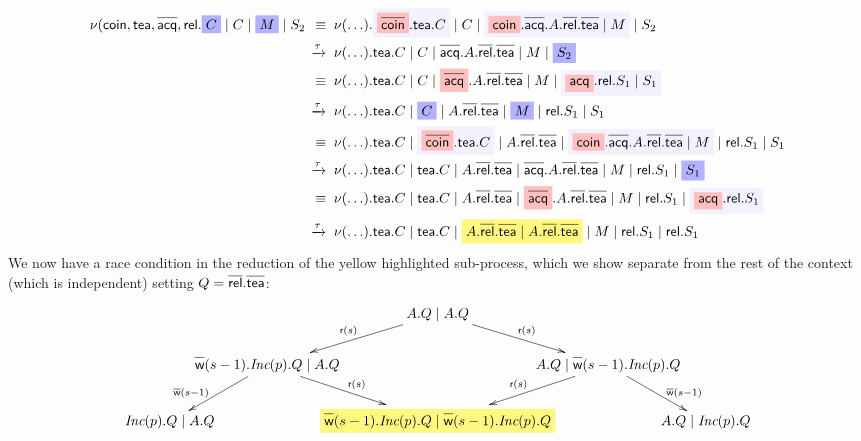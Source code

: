 \documentclass{article}
\def\mystrut{\rule{0pt}{0.68em}}
\newcommand{\act}[1]{\textsf{#1}}
\newcommand{\da}[1]{\overline{\mystrut\textsf{#1}}}
\newcommand{\dak}[1]{\overline{\textsf{#1}}}
\newcommand{\highlight}[1]{%
  \colorbox{yellow!50}{$\displaystyle#1$}}
\newcommand{\highlightG}[1]{%
  \colorbox{blue!30}{$\displaystyle#1$}}
\newcommand{\highlightR}[1]{%
  \colorbox{red!25}{$\displaystyle#1$}}
\newcommand{\highlightGH}[1]{%
  \colorbox{blue!5}{$\displaystyle#1$}}
\theoremstyle{definition}
\newcommand{\src}[1]{\highlightR{#1}}
\newcommand{\srch}[1]{\highlightG{#1}}
\newcommand{\trgh}[1]{\highlightGH{#1}}
\newcommand{\subd}[1]{\highlight{#1}}
\newcommand{\restr}[2]{\nu #2 . #1}
\begin{document}
\begin{align*}
  \restr{\srch{C} \mid C \mid \srch{M} \mid S_2}{(\act{coin}, \act{tea}, \da{acq}, \act{rel}} \;\,
\equiv \;\; & \restr{\trgh{\src{\da{coin}}.\act{tea}.C} \mid C \mid \trgh{\src{\act{coin}}.\da{acq}.A.\da{rel}.\da{tea} \mid M} \mid S_2}{(\ldots)} \\
\xrightarrow{\tau} \;\; & \restr{{\act{tea}.C} \mid C \mid {{\da{acq}}.A.\da{rel}.\da{tea} \mid M} \mid \srch{S_2}}{(\ldots)} \\
\equiv \;\; & \restr{{\act{tea}.C} \mid C \mid {{\src{\da{acq}}}.A.\da{rel}.\da{tea} \mid M} \mid \trgh{\src{\act{acq}}.\act{rel}.S_1 \mid S_1}}{(\ldots)} \\
\xrightarrow{\tau} \;\; & \restr{\act{tea}.C \mid \srch{C} \mid A.\da{rel}.\da{tea} \mid \srch{M} \mid \act{rel}.S_1
\mid {S_1}}{(\ldots)}  \\
\equiv \;\; & \restr{\act{tea}.C \mid \trgh{\src{\da{coin}}.\act{tea}.C} \mid A.\da{rel}.\da{tea} \mid \trgh{\src{\act{coin}}.\da{acq}.A.\da{rel}.\da{tea} \mid M} \mid \act{rel}.S_1
\mid S_1}{(\ldots)} \\
\xrightarrow{\tau} \;\; & \restr{\act{tea}.C \mid {\act{tea}.C} \mid A.\da{rel}.\da{tea} \mid {\da{acq}.A.\da{rel}.\da{tea} \mid M} \mid \act{rel}.S_1
\mid \srch{S_1}}{(\ldots)} \\
\equiv \;\; & \restr{\act{tea}.C \mid {\act{tea}.C} \mid A.\da{rel}.\da{tea} \mid {\src{\da{acq}}.A.\da{rel}.\da{tea} \mid M} \mid \act{rel}.S_1
\mid \trgh{\src{\act{acq}}.\act{rel}.S_1}}{(\ldots)} \\
\xrightarrow{\tau} \;\; & \restr{\act{tea}.C \mid {\act{tea}.C} \mid \subd{A.\da{rel}.\da{tea} \mid A.\da{rel}.\da{tea}} \mid M \mid \act{rel}.S_1
\mid {\act{rel}.S_1}}{(\ldots)}
\end{align*}
%
We now have a race condition in the reduction of the yellow highlighted
sub-process, which we show separate from the rest of the context
(which is independent) setting $Q = \da{rel}.\da{tea}$:
%
\begin{align*}
\\[-1.5em]
\begin{array}{c}
\xymatrix@C=-2em@R=2em{
& & A.Q \mid A.Q \ar[dl]_{\act{r}(s)} \ar[dr]^{\act{r}(s)} & & \\
& \da{w}(s-1).\textit{Inc}(p).Q \mid A.Q
\ar@{->}[dl]_(.65){\dak{w}(s-1)} \ar@{->}[dr]^(.5){\act{r}(s)}
 & & A.Q \mid \da{w}(s-1).\textit{Inc}(p).Q \ar@{->}[dl]_(.5){\act{r}(s)} \ar@{->}[dr]^(.65){\dak{w}(s-1)} & \\
\textit{Inc}(p).Q \mid A.Q & & \subd{\da{w}(s-1).\textit{Inc}(p).Q \mid \da{w}(s-1).\textit{Inc}(p).Q} &
 & A.Q \mid \textit{Inc}(p).Q
}
\end{array}
\\[-1.5em]
\end{align*}
\end{document}
